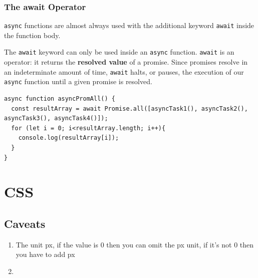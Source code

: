 \documentclass[a4paper, 12pt]{article}
\begin{document}
\subsubsection{The await Operator}
\verb|async| functions are almost always used with the additional keyword \verb|await| inside the function body.

The \verb|await| keyword can only be used inside an \verb|async| function. \verb|await| is an operator: it returns the \textbf{resolved value} of a promise. Since promises resolve in an indeterminate amount of time, \verb|await| halts, or pauses, the execution of our \verb|async| function until a given promise is resolved.
\begin{verbatim}
async function asyncPromAll() {
  const resultArray = await Promise.all([asyncTask1(), asyncTask2(), 
asyncTask3(), asyncTask4()]);
  for (let i = 0; i<resultArray.length; i++){
    console.log(resultArray[i]); 
  }
}
\end{verbatim}




\section{CSS}

\subsection{Caveats}
\begin{enumerate}
\item The unit px, if the value is 0 then you can omit the px unit, if it's not 0 then you have to add px

\item 

\end{enumerate}
\end{document}
